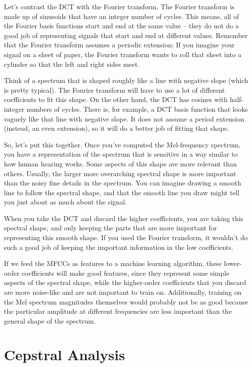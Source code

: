 \documentclass[]{article}
\begin{document}
Let's contrast the DCT with the Fourier transform. The Fourier transform
is made up of sinusoids that have an integer number of cycles. This
means, all of the Fourier basis functions start and end at the same
value -- they do not do a good job of representing signals that start
and end at different values. Remember that the Fourier transform assumes
a periodic extension: If you imagine your signal on a sheet of paper,
the Fourier transform wants to roll that sheet into a cylinder so that
the left and right sides meet.

Think of a spectrum that is shaped roughly like a line with negative
slope (which is pretty typical). The Fourier transform will have to use
a lot of different coefficients to fit this shape. On the other hand,
the DCT has cosines with half-integer numbers of cycles. There is, for
example, a DCT basis function that looks vaguely like that line with
negative slope. It does not assume a period extension (instead, an even
extension), so it will do a better job of fitting that shape.

So, let's put this together. Once you've computed the Mel-frequency
spectrum, you have a representation of the spectrum that is sensitive in
a way similar to how human hearing works. Some aspects of this shape are
more relevant than others. Usually, the larger more overarching spectral
shape is more important than the noisy fine details in the spectrum. You
can imagine drawing a smooth line to follow the spectral shape, and that
the smooth line you draw might tell you just about as much about the
signal.

When you take the DCT and discard the higher coefficients, you are
taking this spectral shape, and only keeping the parts that are more
important for representing this smooth shape. If you used the Fourier
transform, it wouldn't do such a good job of keeping the important
information in the low coefficients.

If we feed the MFCCs as features to a machine learning algorithm, these
lower-order coefficients will make good features, since they represent
some simple aspects of the spectral shape, while the higher-order
coefficients that you discard are more noise-like and are not important
to train on. Additionally, training on the Mel spectrum magnitudes
themselves would probably not be as good because the particular
amplitude at different frequencies are less important than the general
shape of the spectrum.

\section{Cepstral Analysis}\label{cepstral-analysis}
\end{document}
